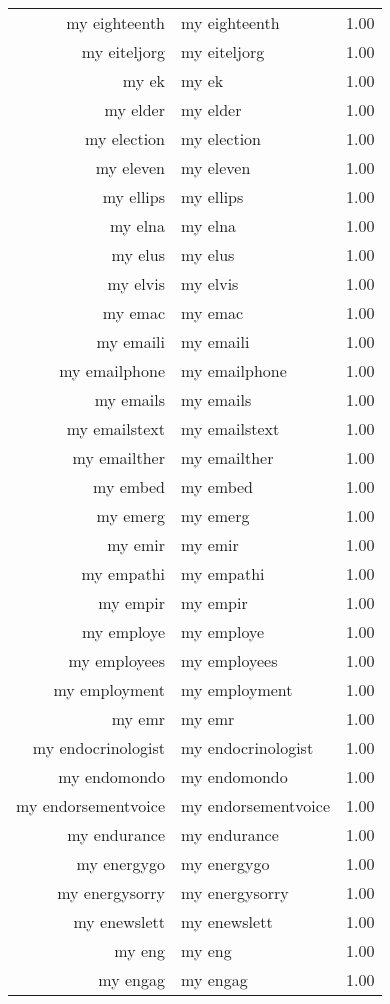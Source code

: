 \begin{table}[ht]
\begin{tabular}{rlr}
  my eighteenth & my eighteenth & 1.00 \\ 
  my eiteljorg & my eiteljorg & 1.00 \\ 
  my ek & my ek & 1.00 \\ 
  my elder & my elder & 1.00 \\ 
  my election & my election & 1.00 \\ 
  my eleven & my eleven & 1.00 \\ 
  my ellips & my ellips & 1.00 \\ 
  my elna & my elna & 1.00 \\ 
  my elus & my elus & 1.00 \\ 
  my elvis & my elvis & 1.00 \\ 
  my emac & my emac & 1.00 \\ 
  my emaili & my emaili & 1.00 \\ 
  my emailphone & my emailphone & 1.00 \\ 
  my emails & my emails & 1.00 \\ 
  my emailstext & my emailstext & 1.00 \\ 
  my emailther & my emailther & 1.00 \\ 
  my embed & my embed & 1.00 \\ 
  my emerg & my emerg & 1.00 \\ 
  my emir & my emir & 1.00 \\ 
  my empathi & my empathi & 1.00 \\ 
  my empir & my empir & 1.00 \\ 
  my employe & my employe & 1.00 \\ 
  my employees & my employees & 1.00 \\ 
  my employment & my employment & 1.00 \\ 
  my emr & my emr & 1.00 \\ 
  my endocrinologist & my endocrinologist & 1.00 \\ 
  my endomondo & my endomondo & 1.00 \\ 
  my endorsementvoice & my endorsementvoice & 1.00 \\ 
  my endurance & my endurance & 1.00 \\ 
  my energygo & my energygo & 1.00 \\ 
  my energysorry & my energysorry & 1.00 \\ 
  my enewslett & my enewslett & 1.00 \\ 
  my eng & my eng & 1.00 \\ 
  my engag & my engag & 1.00 \\ 

\end{tabular}
\end{table}
